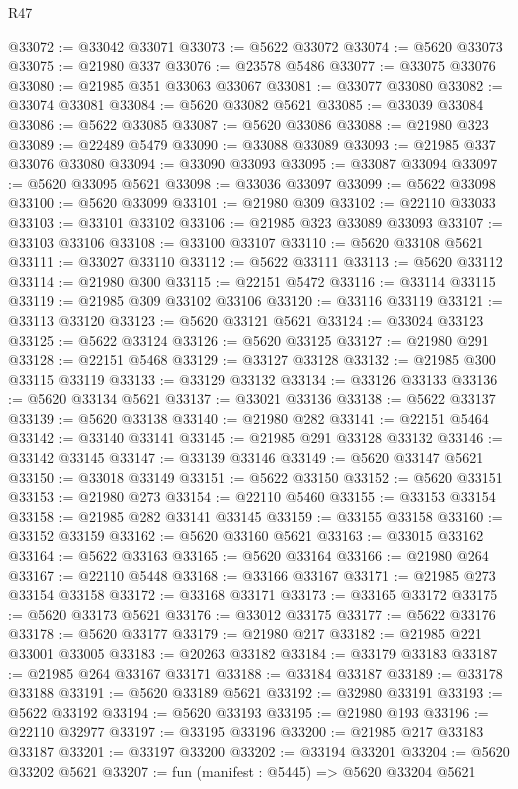 \begin{lexlean}{R47}
\begin{coremodule}
@33072 := @33042 @33071
@33073 := @5622 @33072
@33074 := @5620 @33073
@33075 := @21980 @337
@33076 := @23578 @5486
@33077 := @33075 @33076
@33080 := @21985 @351 @33063 @33067
@33081 := @33077 @33080
@33082 := @33074 @33081
@33084 := @5620 @33082 @5621
@33085 := @33039 @33084
@33086 := @5622 @33085
@33087 := @5620 @33086
@33088 := @21980 @323
@33089 := @22489 @5479
@33090 := @33088 @33089
@33093 := @21985 @337 @33076 @33080
@33094 := @33090 @33093
@33095 := @33087 @33094
@33097 := @5620 @33095 @5621
@33098 := @33036 @33097
@33099 := @5622 @33098
@33100 := @5620 @33099
@33101 := @21980 @309
@33102 := @22110 @33033
@33103 := @33101 @33102
@33106 := @21985 @323 @33089 @33093
@33107 := @33103 @33106
@33108 := @33100 @33107
@33110 := @5620 @33108 @5621
@33111 := @33027 @33110
@33112 := @5622 @33111
@33113 := @5620 @33112
@33114 := @21980 @300
@33115 := @22151 @5472
@33116 := @33114 @33115
@33119 := @21985 @309 @33102 @33106
@33120 := @33116 @33119
@33121 := @33113 @33120
@33123 := @5620 @33121 @5621
@33124 := @33024 @33123
@33125 := @5622 @33124
@33126 := @5620 @33125
@33127 := @21980 @291
@33128 := @22151 @5468
@33129 := @33127 @33128
@33132 := @21985 @300 @33115 @33119
@33133 := @33129 @33132
@33134 := @33126 @33133
@33136 := @5620 @33134 @5621
@33137 := @33021 @33136
@33138 := @5622 @33137
@33139 := @5620 @33138
@33140 := @21980 @282
@33141 := @22151 @5464
@33142 := @33140 @33141
@33145 := @21985 @291 @33128 @33132
@33146 := @33142 @33145
@33147 := @33139 @33146
@33149 := @5620 @33147 @5621
@33150 := @33018 @33149
@33151 := @5622 @33150
@33152 := @5620 @33151
@33153 := @21980 @273
@33154 := @22110 @5460
@33155 := @33153 @33154
@33158 := @21985 @282 @33141 @33145
@33159 := @33155 @33158
@33160 := @33152 @33159
@33162 := @5620 @33160 @5621
@33163 := @33015 @33162
@33164 := @5622 @33163
@33165 := @5620 @33164
@33166 := @21980 @264
@33167 := @22110 @5448
@33168 := @33166 @33167
@33171 := @21985 @273 @33154 @33158
@33172 := @33168 @33171
@33173 := @33165 @33172
@33175 := @5620 @33173 @5621
@33176 := @33012 @33175
@33177 := @5622 @33176
@33178 := @5620 @33177
@33179 := @21980 @217
@33182 := @21985 @221 @33001 @33005
@33183 := @20263 @33182
@33184 := @33179 @33183
@33187 := @21985 @264 @33167 @33171
@33188 := @33184 @33187
@33189 := @33178 @33188
@33191 := @5620 @33189 @5621
@33192 := @32980 @33191
@33193 := @5622 @33192
@33194 := @5620 @33193
@33195 := @21980 @193
@33196 := @22110 @32977
@33197 := @33195 @33196
@33200 := @21985 @217 @33183 @33187
@33201 := @33197 @33200
@33202 := @33194 @33201
@33204 := @5620 @33202 @5621
@33207 := fun (manifest : @5445) => @5620 @33204 @5621

\end{coremodule}
\end{lexlean}
